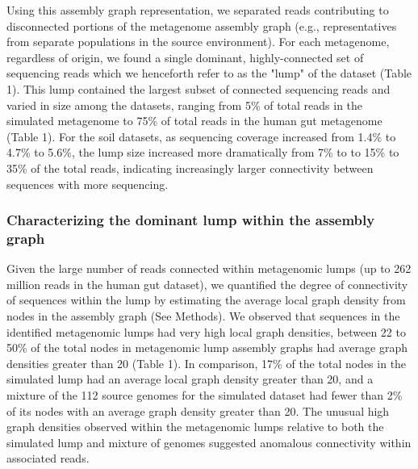 \documentclass[11pt]{article} %
\begin{document}
Using this assembly graph representation, we separated reads contributing to disconnected portions of the metagenome assembly graph (e.g., representatives from separate populations in the source environment).  For each metagenome, regardless of origin, we found a single dominant, highly-connected set of sequencing reads which we henceforth refer to as the  "lump"  of the dataset (Table 1).  This lump contained the largest subset of connected sequencing reads and varied in size among the datasets, ranging from 5\% of total reads in the simulated metagenome to 75\% of total reads in the human gut metagenome (Table 1).  For the soil datasets, as sequencing coverage increased from 1.4\% to 4.7\% to 5.6\%, the lump size increased more dramatically from 7\% to to 15\% to 35\% of the total reads, indicating increasingly larger connectivity between sequences with more sequencing.

\subsubsection{Characterizing the dominant lump within the assembly graph}

Given the large number of reads connected within metagenomic lumps (up to 262 million reads in the human gut dataset), we quantified the degree of connectivity of sequences within the lump by estimating the average local graph density from nodes in the assembly graph (See Methods).  We observed that sequences in the identified metagenomic lumps had very high local graph densities, between 22 to 50\% of the total nodes in metagenomic lump assembly graphs had average graph densities greater than 20 (Table 1).  In comparison, 17\% of the total nodes in the simulated lump had an average local graph density greater than 20, and a mixture of the 112 source genomes for the simulated dataset had fewer than 2\% of its nodes with an average graph density greater than 20.  The unusual high graph densities observed within the metagenomic lumps relative to both the simulated lump and mixture of genomes suggested anomalous connectivity within associated reads.  
\end{document}
